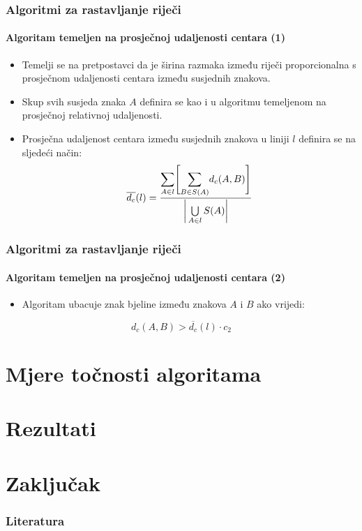 \documentclass{beamer}
\begin{document}
\begin{frame}
\frametitle{Algoritmi za rastavljanje riječi}
\framesubtitle{Algoritam temeljen na prosječnoj udaljenosti centara (1)}
\begin{itemize}
    \item Temelji se na pretpostavci da je širina razmaka između riječi proporcionalna
          s prosječnom udaljenosti centara između susjednih znakova.
    \item Skup svih susjeda znaka $A$ definira se kao i u algoritmu temeljenom
          na prosječnoj relativnoj udaljenosti.
    \item Prosječna udaljenost centara između susjednih znakova u liniji
          $l$ definira se na sljedeći način:
    \begin{equation}
    \overline{d_c}(l) =
    \frac{
        \mathlarger{\sum}\limits_{A \in l}
        \Bigg[
        \mathlarger{\sum}\limits_{B \in S(A)} d_c(A, B)
        \Bigg]
    }
    {\bigg|\bigcup\limits_{A \in l} S(A)\bigg|}
    \end{equation}
\end{itemize}
\end{frame}
\begin{frame}
\frametitle{Algoritmi za rastavljanje riječi}
\framesubtitle{Algoritam temeljen na prosječnoj udaljenosti centara (2)}
\begin{itemize}
\item Algoritam ubacuje znak bjeline između znakova $A$ i $B$ ako vrijedi:
\end{itemize}
\begin{equation}
d_c(A, B) > \overline{d_c}(l) \cdot c_2
\end{equation}
\end{frame}

\section{Mjere točnosti algoritama}
\section{Rezultati}
\section{Zaključak}

\begin{frame}
\frametitle{Literatura}


\end{frame}
\end{document}
